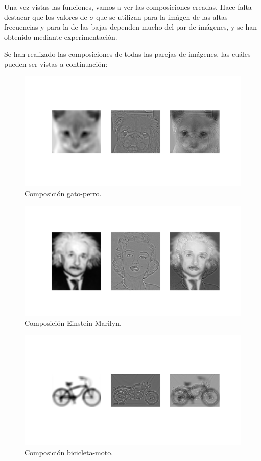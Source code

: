 \documentclass[11pt,a4paper]{article}
\begin{document}
Una vez vistas las funciones, vamos a ver las composiciones creadas. Hace falta destacar que los valores de $\sigma$ que
se utilizan para la imágen de las altas frecuencias y para la de las bajas dependen mucho del par de imágenes, y se han
obtenido mediante experimentación.

Se han realizado las composiciones de todas las parejas de imágenes, las cuáles pueden ser vistas a continuación:

\begin{figure}[H]
\centering
\includegraphics[scale=0.3]{img/hyb1.png}
\caption{Composición gato-perro.}
\label{fig:hyb1}
\end{figure}

\begin{figure}[H]
\centering
\includegraphics[scale=0.3]{img/hyb2.png}
\caption{Composición Einstein-Marilyn.}
\label{fig:hyb2}
\end{figure}

\begin{figure}[H]
\centering
\includegraphics[scale=0.3]{img/hyb3.png}
\caption{Composición bicicleta-moto.}
\label{fig:hyb3}
\end{figure}
\end{document}
